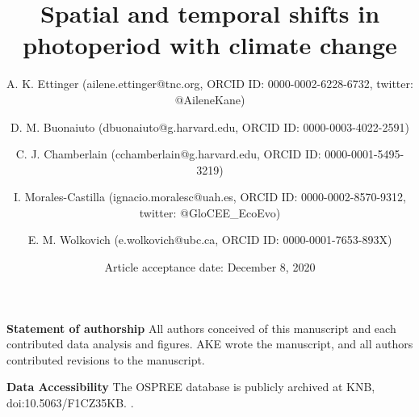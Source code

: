 \documentclass{article}
\begin{document}
%


\title{Spatial and temporal shifts in photoperiod with climate change} %


\author[1,2,a]{A. K. Ettinger (ailene.ettinger@tnc.org, ORCID ID:  0000-0002-6228-6732, twitter: @AileneKane)}
\author[2,3]{D. M. Buonaiuto (dbuonaiuto@g.harvard.edu, ORCID ID: 0000-0003-4022-2591)}

\author[2,3]{C. J. Chamberlain (cchamberlain@g.harvard.edu, ORCID ID: 0000-0001-5495-3219)}

\author[2,3,4,5]{I. Morales-Castilla (ignacio.moralesc@uah.es, ORCID ID: 0000-0002-8570-9312, twitter: @GloCEE\_EcoEvo)}

\author[2,3,6]{E. M. Wolkovich (e.wolkovich@ubc.ca, ORCID ID: 0000-0001-7653-893X)}






 


\date{Article acceptance date: December 8, 2020} 

\maketitle %
\textbf{Statement of authorship} 
All authors conceived of this manuscript and each contributed data analysis and figures. AKE wrote the manuscript, and all authors contributed revisions to the manuscript. 

\textbf{Data Accessibility} The OSPREE database is publicly archived at KNB, doi:10.5063/F1CZ35KB. \citep{wolkovich2019}.
\end{document}
